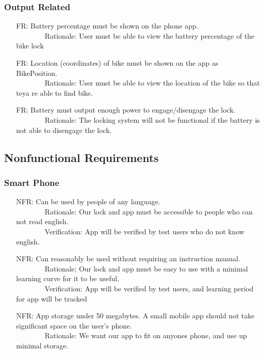 \documentclass[12pt]{article}
\newcounter{reqnum} %
\newcounter{nfrnum} %
\begin{document}
\subsubsection{Output Related}
\begin{itemize}
\setlength{\itemindent}{.5in}
\item[FR\refstepcounter{reqnum}\thereqnum\label{FR11}:] Battery percentage must be shown on the phone app.
\\ \-\ \-\ \-\ \-\ \-\ \-\ \-\ \-\ Rationale: User must be able to view the battery percentage of the bike lock
\item[FR\refstepcounter{reqnum}\thereqnum\label{FR12}:] Location (coordinates) of bike must be shown on the app as BikePosition.
\\ \-\ \-\ \-\ \-\ \-\ \-\ \-\ \-\ Rationale: User must be able to view the location of the bike so that teya re able to find bike.
\item[FR\refstepcounter{reqnum}\thereqnum\label{FR13}:] Battery must output enough power to engage/disengage the lock.
\\ \-\ \-\ \-\ \-\ \-\ \-\ \-\ \-\ Rationale: The locking system will not be functional if the battery is not able to disengage the lock.
\end{itemize}

\subsection{Nonfunctional Requirements}

\subsubsection{Smart Phone}
\begin{itemize}
\setlength{\itemindent}{.5in}
\item[NFR\refstepcounter{nfrnum}\thenfrnum\label{NFR1}:] Can be used by people of any language.
\\ \-\ \-\ \-\ \-\ \-\ \-\ \-\ \-\ Rationale: Our lock and app must be accessible to people who can not read english.
\\ \-\ \-\ \-\ \-\ \-\ \-\ \-\ \-\ Verification: App will be verified by test users who do not know english.
\item[NFR\refstepcounter{nfrnum}\thenfrnum\label{NFR2}:] Can reasonably be used without requiring an instruction manual.
\\ \-\ \-\ \-\ \-\ \-\ \-\ \-\ \-\ Rationale: Our lock and app must be easy to use with a minimal learning curve for it to be useful.
\\ \-\ \-\ \-\ \-\ \-\ \-\ \-\ \-\ Verification: App will be verified by test users, and learning period for app will be tracked
\item[NFR\refstepcounter{nfrnum}\thenfrnum\label{NFR3}:] App storage under 50 megabytes. A small mobile app should not take significant space on the user's phone.
\\ \-\ \-\ \-\ \-\ \-\ \-\ \-\ \-\ Rationale: We want our app to fit on anyones phone, and use up minimal storage.
\end{itemize}
\end{document}
